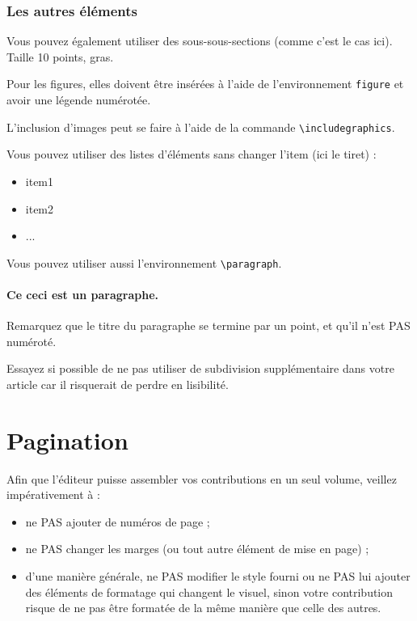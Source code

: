 \documentclass[french]{pfia}
\begin{document}
\subsubsection{Les autres éléments}

Vous pouvez également utiliser des sous-sous-sections (comme c'est le cas ici). Taille 10 points, gras.

Pour les figures, elles doivent être insérées à l'aide de l'environnement \verb|figure| et avoir une légende numérotée.

L'inclusion d'images peut se faire à l'aide de la commande
\verb|\includegraphics|.

Vous pouvez utiliser des listes d'éléments sans changer l'item (ici le tiret) :
\begin{itemize}
  \item item1
  \item item2
  \item ...
\end{itemize}

Vous pouvez utiliser aussi l'environnement \verb|\paragraph|.

\paragraph{Ce ceci est un paragraphe.} Remarquez que le titre du paragraphe se termine par un point, et qu'il n'est PAS numéroté.

Essayez si possible de ne pas utiliser de subdivision supplémentaire dans votre article car il risquerait de perdre en lisibilité. 
\section{Pagination}

Afin que l'éditeur puisse assembler vos contributions en un seul volume, veillez impérativement à :
\begin{itemize}
  \item ne PAS ajouter de numéros de page ;
  \item ne PAS changer les marges (ou tout autre élément de mise en page) ;
  \item d'une manière générale, ne PAS modifier le style fourni ou ne PAS lui ajouter des éléments de formatage qui changent le visuel, sinon votre contribution risque de ne pas être formatée de la même manière que celle des autres.
\end{itemize}
\end{document}
